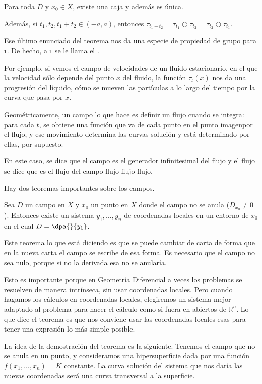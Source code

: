 \begin{theorem} Para toda $D$ y $x_0 ∈ X$, existe una caja y además es única.

Además, si $t_1, t_2, t_1 + t_2 ∈ (-a, a)$, entonces $τ_{t_1+t_2} = τ_{t_1} ○ τ_{t_2} = τ_{t_2} ○ τ_{t_1}$.
\end{theorem}

Ese último enunciado del teorema nos da una especie de propiedad de grupo para τ. De hecho, a τ se le llama el .

Por ejemplo, si vemos el campo de velocidades de un fluido estacionario, en el que la velocidad sólo depende del punto $x$ del fluido, la función $τ_t(x)$ nos da una progresión del líquido, cómo se mueven las partículas a lo largo del tiempo por la curva que pasa por $x$.

Geométricamente, un campo lo que hace es definir un flujo cuando se integra: para cada $t$, se obtiene una función que va de cada punto en el punto imagenpor el flujo, y ese movimiento determina las curvas solución y está determinado por ellas, por supuesto.

En este caso, se dice que el campo es el generador infinitesimal del flujo y el flujo se dice que es el flujo del campo flujo flujo flujo.

Hay dos teoremas importantes sobre los campos.

\begin{theorem} Sea $D$ un campo en $X$ y $x_0$ un punto en $X$ donde el campo no se anula ($D_{x_0} ≠ 0$). Entonces existe un sistema $y_1, \dotsc, y_n$ de coordenadas locales en un entorno de $x_0$ en el cual $D = \dpa{}{y_1}$.
\end{theorem}

Este teorema lo que está diciendo es que se puede cambiar de carta de forma que en la nueva carta el campo se escribe de esa forma. Es necesario que el campo no sea nulo, porque si no la derivada esa no se anularía.

Esto es importante porque en Geometría Diferencial a veces los problemas se resuelven de manera intrínseca, sin usar coordenadas locales. Pero cuando hagamos los cálculos en coordenadas locales, elegiremos un sistema mejor adaptado al problema para hacer el cálculo como si fuera en abiertos de $ℝ^n$. Lo que dice el teorema es que nos conviene usar las coordenadas locales esas para tener una expresión lo más simple posible.

La idea de la demostración del teorema es la siguiente. Tenemos el campo que no se anula en un punto, y consideramos una hipersuperficie dada por una función $f(x_1, \dotsc, x_n) = K$ constante. La curva solución del sistema que nos daría las nuevas coordenadas será una curva transversal a la superficie.

